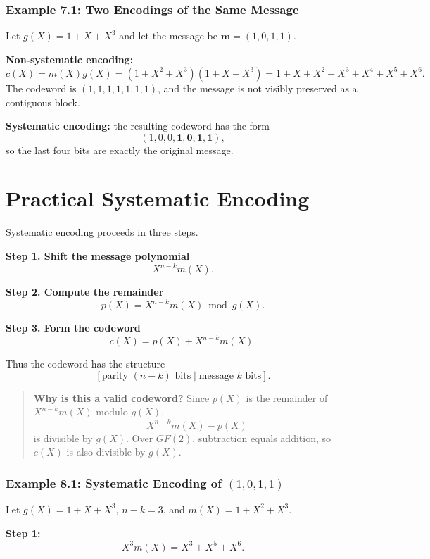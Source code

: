 \documentclass[11pt,oneside]{book}
\theoremstyle{plain}
\theoremstyle{definition}
\theoremstyle{remark}
\begin{document}
\subsubsection{Example 7.1: Two Encodings of the Same
Message}\label{example-7.1-two-encodings-of-the-same-message}

Let \(g(X)=1+X+X^3\) and let the message be \(\mathbf{m}=(1,0,1,1)\).

\textbf{Non-systematic encoding:}
\[c(X)=m(X)g(X)=(1+X^2+X^3)(1+X+X^3)=1+X+X^2+X^3+X^4+X^5+X^6.\] The
codeword is \((1,1,1,1,1,1,1)\), and the message is not visibly
preserved as a contiguous block.

\textbf{Systematic encoding:} the resulting codeword has the form
\[(1,0,0,\mathbf{1,0,1,1}),\] so the last four bits are exactly the
original message.


\section{Practical Systematic Encoding}\label{sec:practical-systematic-encoding}

Systematic encoding proceeds in three steps.

\textbf{Step 1. Shift the message polynomial} \[X^{n-k}m(X).\]

\textbf{Step 2. Compute the remainder} \[p(X)=X^{n-k}m(X) \bmod g(X).\]

\textbf{Step 3. Form the codeword} \[c(X)=p(X)+X^{n-k}m(X).\]

Thus the codeword has the structure
\[[\text{parity }(n-k)\text{ bits} \mid \text{message }k\text{ bits}].\]

\begin{quote}
\textbf{Why is this a valid codeword?} Since \(p(X)\) is the remainder
of \(X^{n-k}m(X)\) modulo \(g(X)\), \[X^{n-k}m(X)-p(X)\] is divisible by
\(g(X)\). Over \(GF(2)\), subtraction equals addition, so \(c(X)\) is
also divisible by \(g(X)\).
\end{quote}

\subsubsection{\texorpdfstring{Example 8.1: Systematic Encoding of
\((1,0,1,1)\)}{Example 8.1: Systematic Encoding of (1,0,1,1)}}\label{example-8.1-systematic-encoding-of-1011}

Let \(g(X)=1+X+X^3\), \(n-k=3\), and \(m(X)=1+X^2+X^3\).

\textbf{Step 1:} \[X^3m(X)=X^3+X^5+X^6.\]
\end{document}
